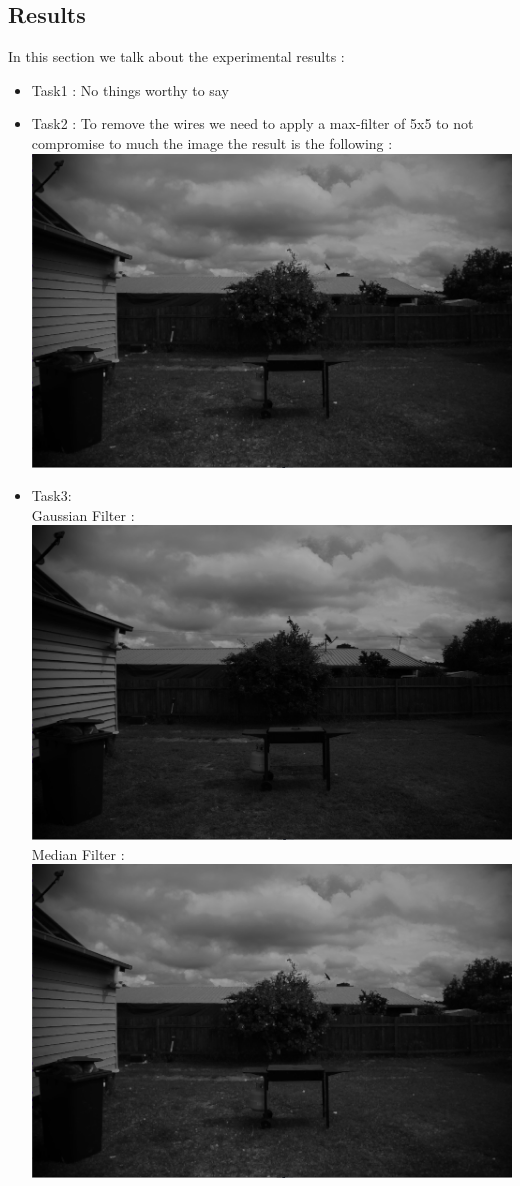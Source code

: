 \documentclass{article}
\begin{document}
\begin{flushleft}
\newpage
\subsection*{Results}
In this section we talk about the experimental results :
\begin{itemize}
  \item Task1 : No things worthy to say 
  \item Task2 : To remove the wires we need to apply a max-filter of 5x5 to not compromise to much the image the result is the following :
  \includegraphics[scale = 0.35]{images/max_filter5x5.png}
  \item Task3:\\
  Gaussian Filter :
  \includegraphics[scale = 0.35]{images/gaussing_filter_3x3.png}
  Median Filter :
  \includegraphics[scale = 0.35]{max_filter5x5}

\end{itemize}
\end{flushleft}
\end{document}
